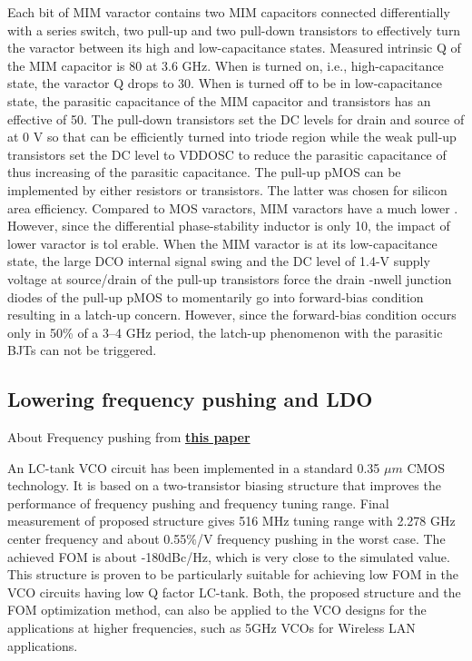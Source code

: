 \begin{info} %
Each bit of MIM varactor contains two MIM capacitors connected differentially with a series switch, two pull-up and two pull-down transistors to effectively turn the varactor between its high and low-capacitance states. Measured intrinsic Q of the MIM capacitor is 80 at 3.6 GHz. When is turned on, i.e., high-capacitance state, the varactor Q drops to 30. When is turned off to be in low-capacitance state, the parasitic capacitance of the MIM capacitor and transistors has an effective of 50. The pull-down transistors set the DC levels for drain and source of at 0 V so that
can be efficiently turned into triode region while the weak pull-up transistors set the DC level to VDDOSC to reduce the parasitic capacitance of thus increasing of the parasitic capacitance. The pull-up pMOS can be implemented by either resistors or transistors. The latter was chosen for silicon area efficiency. Compared to MOS varactors, MIM varactors have a much lower . However, since the differential phase-stability inductor is only 10, the impact of lower varactor is tol erable. When the MIM varactor is at its low-capacitance state, the large DCO internal signal swing and the DC level of 1.4-V supply voltage at source/drain of the pull-up transistors force the drain -nwell junction diodes of the pull-up pMOS to momentarily go into forward-bias condition resulting in a latch-up concern. However, since the forward-bias condition occurs only in 50\% of a 3–4 GHz period, the latch-up phenomenon with the parasitic BJTs can not be triggered.
\end{info}

\subsection{Lowering frequency pushing and LDO}

About Frequency pushing from \href{https://www.atlantis-press.com/article/6376.pdf}{\textbf{this paper}}

\begin{info} %
An LC-tank VCO circuit has been implemented in a standard 0.35 $\mu m$ CMOS technology. It is based on a two-transistor biasing structure that improves the performance of frequency pushing and frequency tuning range. Final measurement of proposed structure gives 516 MHz tuning range with 2.278 GHz center frequency and about 0.55$\%$/V frequency pushing in the worst case. The achieved FOM is about -180dBc/Hz, which is very close to the simulated value. This structure is proven to be particularly suitable for achieving low FOM in the VCO circuits having low Q factor LC-tank. Both, the proposed structure and the FOM optimization method, can also be applied to the VCO designs for the applications at higher frequencies, such as 5GHz VCOs for Wireless LAN applications.
\end{info}

